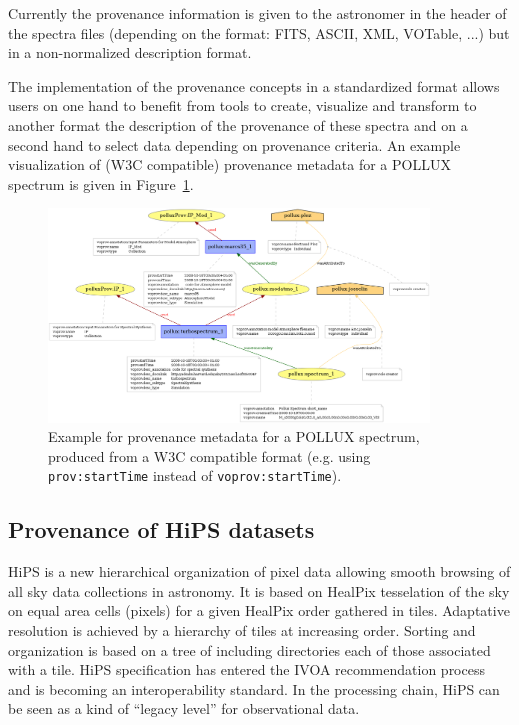 Currently the provenance information is given to the astronomer in the header of the spectra files (depending on the format: FITS, ASCII, XML, VOTable, ...) but in a non-normalized description format. 

The implementation of the provenance concepts in a standardized format allows users on one hand to benefit from tools to create, visualize and transform to another format the description of the provenance of these spectra and on a second hand to select data depending on provenance criteria. An example visualization of (W3C compatible) provenance metadata for a POLLUX spectrum is given in Figure~\ref{fig:pollux}.

\begin{figure}
\centering
\includegraphics[width=0.9\textwidth]{usecase_Pollux_example1.png}
\caption[Example for provenance metadata for a POLLUX spectrum]{Example for provenance metadata for a POLLUX spectrum, produced from a W3C compatible format (e.g. using \texttt{prov:startTime} instead of \texttt{voprov:startTime}).}
\label{fig:pollux}
\end{figure}

\subsection{Provenance of HiPS datasets}
HiPS \cite{std:HiPs} is a new hierarchical organization of pixel data allowing smooth browsing of all sky data collections in astronomy. It is based on HealPix tesselation of the sky on equal area cells (pixels) for a given HealPix order gathered in tiles. Adaptative resolution is achieved by a hierarchy of tiles at increasing order. Sorting and organization is based on a tree of including directories each of those associated with a tile. HiPS specification has entered the IVOA recommendation process and is becoming an interoperability standard.
In the processing chain, HiPS can be seen as a kind of ``legacy level'' for observational data.



